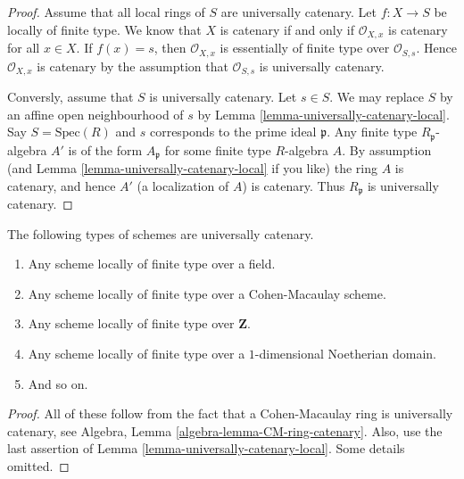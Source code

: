 \begin{proof}
Assume that all local rings of $S$ are universally catenary.
Let $f : X \to S$ be locally of finite type.
We know that $X$ is catenary if and only if $\mathcal{O}_{X, x}$ is
catenary for all $x \in X$. If $f(x) = s$, then $\mathcal{O}_{X, x}$
is essentially of finite type over $\mathcal{O}_{S, s}$. Hence
$\mathcal{O}_{X, x}$ is catenary by the assumption that
$\mathcal{O}_{S, s}$ is universally catenary.

\medskip\noindent
Conversly, assume that $S$ is universally catenary. Let $s \in S$.
We may replace $S$ by an affine open neighbourhood of $s$ by
Lemma \ref{lemma-universally-catenary-local}. Say $S = \text{Spec}(R)$
and $s$ corresponds to the prime ideal $\mathfrak p$. Any finite
type $R_{\mathfrak p}$-algebra $A'$ is of the form
$A_{\mathfrak p}$ for some finite type $R$-algebra $A$.
By assumption (and Lemma \ref{lemma-universally-catenary-local} if you like)
the ring $A$ is catenary, and hence $A'$ (a localization of $A$) is
catenary. Thus $R_{\mathfrak p}$ is universally catenary.
\end{proof}

\begin{lemma}
\label{lemma-ubiquity-uc}
The following types of schemes are universally catenary.
\begin{enumerate}
\item Any scheme locally of finite type over a field.
\item Any scheme locally of finite type over a Cohen-Macaulay scheme.
\item Any scheme locally of finite type over $\mathbf{Z}$.
\item Any scheme locally of finite type over a $1$-dimensional
Noetherian domain.
\item And so on.
\end{enumerate}
\end{lemma}

\begin{proof}
All of these follow from the fact that a
Cohen-Macaulay ring is universally catenary, see
Algebra, Lemma \ref{algebra-lemma-CM-ring-catenary}.
Also, use the last assertion of
Lemma \ref{lemma-universally-catenary-local}.
Some details omitted.
\end{proof}























